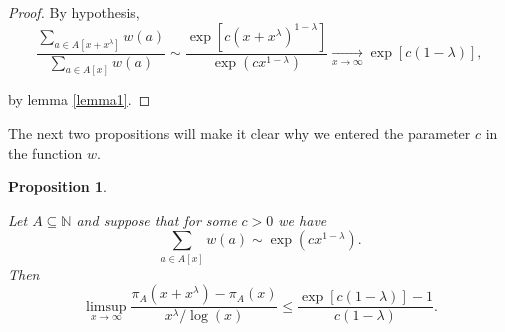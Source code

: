 \documentclass[11pt]{amsart}
\newtheorem{proposition}[theorem]{Proposition}
\numberwithin{equation}{section}
\newcommand{\N}{\mathbb{N}}
\newcommand{\disum}{\displaystyle \sum}
\newcommand{\difrac}{\displaystyle \frac}
\newcommand{\dilimsup}{\displaystyle \limsup}
\begin{document}
\begin{proof} By hypothesis, $$\difrac{\disum_{a \in A[x+x^\lambda]} w(a)}{\disum_{a \in A[x]} w(a)} \sim \difrac{\exp[c(x + x^{\lambda})^{1 - \lambda}]}{\exp(cx^{1 - \lambda})} \xrightarrow[x \to \infty]{} \exp[c(1 - \lambda)],$$

\noindent by lemma \ref{lemma1}. \end{proof}

The next two propositions will make it clear why we entered the parameter $c$ in the function $w$.

\begin{proposition} \label{limsupproposition}

Let $A \subseteq \N$ and suppose that for some $c > 0$ we have $$\disum_{a \in A[x]} w(a) \sim \exp(cx^{1 - \lambda}).$$ Then $$\dilimsup_{x \to \infty} \difrac{\pi_A(x + x^\lambda) - \pi_A(x)}{x^\lambda/\log(x)} \leq \difrac{\exp[c(1 - \lambda)] - 1}{c(1 - \lambda)}.$$

\end{proposition}
\end{document}
